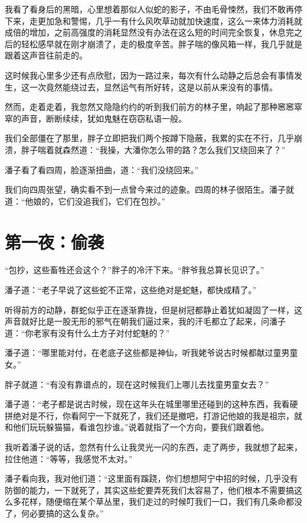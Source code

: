 我看了看身后的黑暗，心里想着那似人似蛇的影子，不由毛骨悚然，我们不敢再停下来，走更加急和警惕，几乎一有什么风吹草动就加快速度，这么一来体力消耗就成倍的增加，之前高强度的消耗显然没有办法在这么短的时间完全恢复，休息完之后的轻松感早就在刚才崩溃了，走的极度辛苦。胖子喘的像风箱一样，我几乎就是跟着这声音往前走的。

这时候我心里多少还有点欣慰，因为一路过来，每次有什么动静之后总会有事情发生，这一次竟然能绕过去，显然运气有所好转，这是以前从来没有的事情。

然而，走着走着，我忽然又隐隐约约的听到我们前方的林子里，响起了那种窸窸窣窣的声音，断断续续，犹如鬼魅在窃窃私语一般。

我们全部僵在了那里，胖子立即把我们两个按蹲下隐蔽，我累的实在不行，几乎崩溃，胖子喘着就森然道：“我操，大潘你怎么带的路？怎么我们又绕回来了？”

潘子看了看四周，脸逐渐扭曲，道：“我们没绕回来。”

我们向四周张望，确实看不到一点曾今来过的迹象。四周的林子很陌生。潘子就道：“他娘的，它们没追我们，它们在包抄。”

\chapter{第一夜：偷袭}

“包抄，这些畜牲还会这个？”胖子的冷汗下来。“胖爷我总算长见识了。”

潘子道：“老子早说了这些蛇不正常，这些绝对是蛇魅，都快成精了。”

听得前方的动静，群蛇似乎正在逐渐靠拢，但是树冠都静止着犹如凝固了一样，这声音就好比是一股无形的邪气在朝我们逼过来，我的汗毛都立了起来，问潘子道：“你老家有没有什么土方子对付蛇魅的？”

潘子道：“哪里能对付，在老底子这些都是神仙，听我姥爷说古时候都献过童男童女。”

胖子就道：“有没有靠谱点的，现在这时候我们上哪儿去找童男童女去？”

潘子道：“老子都是说古时候，现在这年头在城里哪里还碰到的这种东西，我看硬拼绝对是不行，你看阿宁一下就死了，我们还是撤吧，打游记他娘的我是祖宗，就和他们玩玩躲猫猫，看谁包抄谁。”说着就指了一个方向，要我们跟着他。

我听着潘子说的话，忽然有什么让我灵光一闪的东西，走了两步，我就想了起来，拉住他道：“等等，我感觉不太对。”

潘子看向我，我对他们道：“这里面有蹊跷，你们想想阿宁中招的时候，几乎没有防御的能力，一下就死了，其实这些蛇要弄死我们太容易了，他们根本不需要搞这么多花样，随便缩在某个草丛里，我们走过的时候叮我们一口，我们有几条命都没了，何必要搞的这么复杂。”

